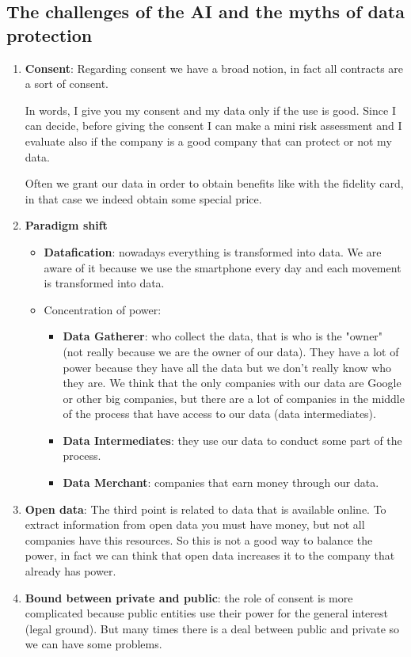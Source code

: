 \subsection{The challenges of the AI and the myths of data protection}
\begin{enumerate}
    \item \textbf{Consent}: Regarding consent we have a broad notion, in fact all contracts are a sort of consent. 
    
    In words, I give you my consent and my data only if the use is good. Since I can decide, before giving the consent I can make a mini risk assessment and I evaluate also if the company is a good company that can protect or not my data. 
    
    Often we grant our data in order to obtain benefits like with the fidelity card, in that case we indeed obtain some special price.
    \item \textbf{Paradigm shift}
    \begin{itemize}
        \item \textbf{Datafication}: nowadays everything is transformed into data. We are aware of it because we use the smartphone every day and each movement is transformed into data.
        \item Concentration of power:
        \begin{itemize}
            \item \textbf{Data Gatherer}: who collect the data, that is who is the "owner" (not really because we are the owner of our data). They have a lot of power because they have all the data but we don't really know who they are. We think that the only companies with our data are Google or other big companies, but there are a lot of companies in the middle of the process that have access to our data (data intermediates).
            \item \textbf{Data Intermediates}: they use our data to conduct some part of the process.
            \item \textbf{Data Merchant}: companies that earn money through our data. 
        \end{itemize}
    \end{itemize}
    \item \textbf{Open data}: The third point is related to data that is available online. To extract information from open data you must have money, but not all companies have this resources. So this is not a good way to balance the power, in fact we can think that open data increases it to the company that already has power.
    \item \textbf{Bound between private and public}: the role of consent is more complicated because public entities use their power for the general interest (legal ground). But many times there is a deal between public and private so we can have some problems.
\end{enumerate}

